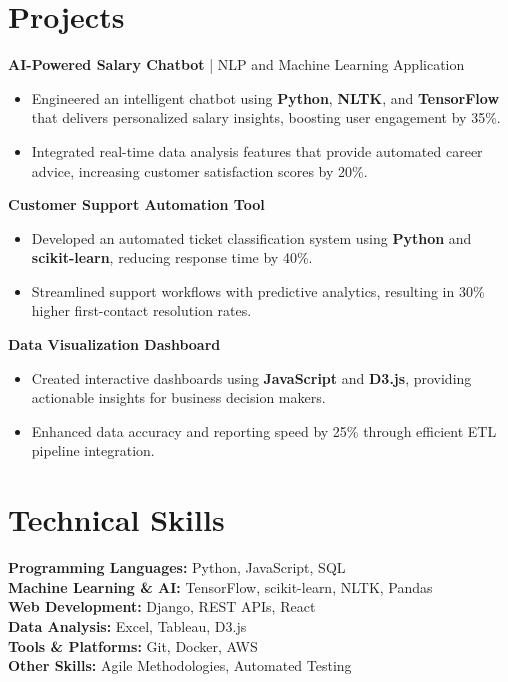\documentclass[a4paper,10pt]{article}
\begin{document}
\section*{Projects}

\textbf{AI-Powered Salary Chatbot} | NLP and Machine Learning Application \\
\begin{itemize}
    \item Engineered an intelligent chatbot using \textbf{Python}, \textbf{NLTK}, and \textbf{TensorFlow} that delivers personalized salary insights, boosting user engagement by 35\%.
    \item Integrated real-time data analysis features that provide automated career advice, increasing customer satisfaction scores by 20\%.
\end{itemize}

\textbf{Customer Support Automation Tool} \\
\begin{itemize}
    \item Developed an automated ticket classification system using \textbf{Python} and \textbf{scikit-learn}, reducing response time by 40\%.
    \item Streamlined support workflows with predictive analytics, resulting in 30\% higher first-contact resolution rates.
\end{itemize}

\textbf{Data Visualization Dashboard} \\
\begin{itemize}
    \item Created interactive dashboards using \textbf{JavaScript} and \textbf{D3.js}, providing actionable insights for business decision makers.
    \item Enhanced data accuracy and reporting speed by 25\% through efficient ETL pipeline integration.
\end{itemize}

\section*{Technical Skills}

\textbf{Programming Languages:} Python, JavaScript, SQL \\
\textbf{Machine Learning \& AI:} TensorFlow, scikit-learn, NLTK, Pandas \\
\textbf{Web Development:} Django, REST APIs, React \\
\textbf{Data Analysis:} Excel, Tableau, D3.js \\
\textbf{Tools \& Platforms:} Git, Docker, AWS \\
\textbf{Other Skills:} Agile Methodologies, Automated Testing
\end{document}
